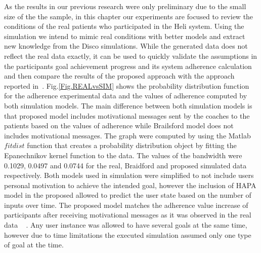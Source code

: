 \documentclass[graybox]{svmult}
\begin{document}
As the results in our previous research were only preliminary due to the small size of the the sample, in this chapter our experiments are focused to review the conditions of the real patients who participated in the Heli system. Using the simulation we intend to mimic real conditions with better models and extract new knowledge from the Disco simulations.  While the generated data does not reflect the real data exactly, it can be used to quickly validate the assumptions in the participants goal achievement progress and its system adherence calculation and then compare the results of the proposed approach with the approach reported in~\cite{Brailsford2016}. Fig.\ref{Fig.REALvsSIM} shows the probability distribution function for the adherence experimental data and the values of adherence computed by both simulation models. The main difference between both simulation models is that proposed model includes motivational messages sent by the coaches to the patients based on the values of adherence while Brailsford model does not includes motivational messages. The graph were computed by using the Matlab $fitdist$ function that creates a probability distribution object by fitting the Epanechnikov kernel function to the data. The values of the bandwidth were 0.1029, 0.0497 and 0.0744 for the real, Braidford and proposed simulated data respectively. Both models used in simulation were simplified to not include users personal motivation to achieve the intended goal, however the inclusion of HAPA model in the proposed allowed to predict the user state based on the number of inputs over time. The proposed model matches the adherence value increase of participants after receiving motivational messages as it was observed in the real data ~\cite{rem2017} .  Any user instance was allowed to have several goals at the same time, however due to time limitations the executed simulation assumed only one type of goal at the time. 
\end{document}
